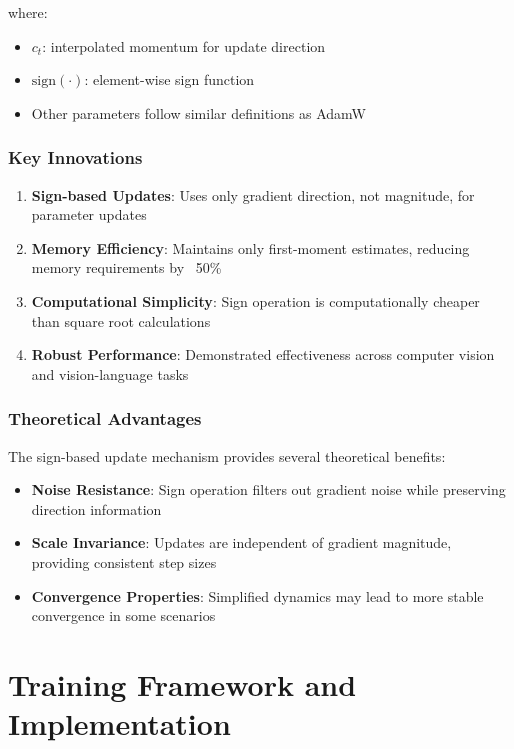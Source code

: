 where:
\begin{itemize}
    \item $c_t$: interpolated momentum for update direction
    \item $\text{sign}(\cdot)$: element-wise sign function
    \item Other parameters follow similar definitions as AdamW
\end{itemize}

\subsubsection{Key Innovations}

\begin{enumerate}
    \item \textbf{Sign-based Updates}: Uses only gradient direction, not magnitude, for parameter updates
    \item \textbf{Memory Efficiency}: Maintains only first-moment estimates, reducing memory requirements by ~50\%
    \item \textbf{Computational Simplicity}: Sign operation is computationally cheaper than square root calculations
    \item \textbf{Robust Performance}: Demonstrated effectiveness across computer vision and vision-language tasks
\end{enumerate}

\subsubsection{Theoretical Advantages}

The sign-based update mechanism provides several theoretical benefits:

\begin{itemize}
    \item \textbf{Noise Resistance}: Sign operation filters out gradient noise while preserving direction information
    \item \textbf{Scale Invariance}: Updates are independent of gradient magnitude, providing consistent step sizes
    \item \textbf{Convergence Properties}: Simplified dynamics may lead to more stable convergence in some scenarios
\end{itemize}


\section{Training Framework and Implementation}

